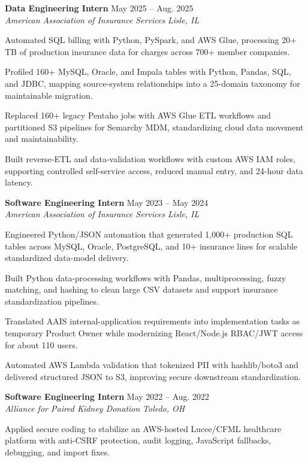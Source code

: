 \documentclass[letterpaper,11pt]{article}
\newcommand{\resumeSubheading}[4]{
  \textbf{#1} \hfill #2\\
  \textit{#3} \hfill \textit{#4}
}
\begin{document}
\resumeSubheading
{Data Engineering Intern}{May 2025 -- Aug. 2025}
{American Association of Insurance Services}{Lisle, IL}
\begin{tightitemize}
  \item Automated SQL billing with Python, PySpark, and AWS Glue, processing 20+ TB of production insurance data for charges across 700+ member companies.
  \item Profiled 160+ MySQL, Oracle, and Impala tables with Python, Pandas, SQL, and JDBC, mapping source-system relationships into a 25-domain taxonomy for maintainable migration.
  \item Replaced 160+ legacy Pentaho jobs with AWS Glue ETL workflows and partitioned S3 pipelines for Semarchy MDM, standardizing cloud data movement and maintainability.
  \item Built reverse-ETL and data-validation workflows with custom AWS IAM roles, supporting controlled self-service access, reduced manual entry, and 24-hour data latency.
\end{tightitemize}

\resumeSubheading
{Software Engineering Intern}{May 2023 -- May 2024}
{American Association of Insurance Services}{Lisle, IL}
\begin{tightitemize}
  \item Engineered Python/JSON automation that generated 1,000+ production SQL tables across MySQL, Oracle, PostgreSQL, and 10+ insurance lines for scalable standardized data-model delivery.
  \item Built Python data-processing workflows with Pandas, multiprocessing, fuzzy matching, and hashing to clean large CSV datasets and support insurance standardization pipelines.
  \item Translated AAIS internal-application requirements into implementation tasks as temporary Product Owner while modernizing React/Node.js RBAC/JWT access for about 110 users.
  \item Automated AWS Lambda validation that tokenized PII with hashlib/boto3 and delivered structured JSON to S3, improving secure downstream standardization.
\end{tightitemize}

\resumeSubheading
{Software Engineering Intern}{May 2022 -- Aug. 2022}
{Alliance for Paired Kidney Donation}{Toledo, OH}
\begin{tightitemize}
  \item Applied secure coding to stabilize an AWS-hosted Lucee/CFML healthcare platform with anti-CSRF protection, audit logging, JavaScript fallbacks, debugging, and import fixes.
\end{tightitemize}
\end{document}
